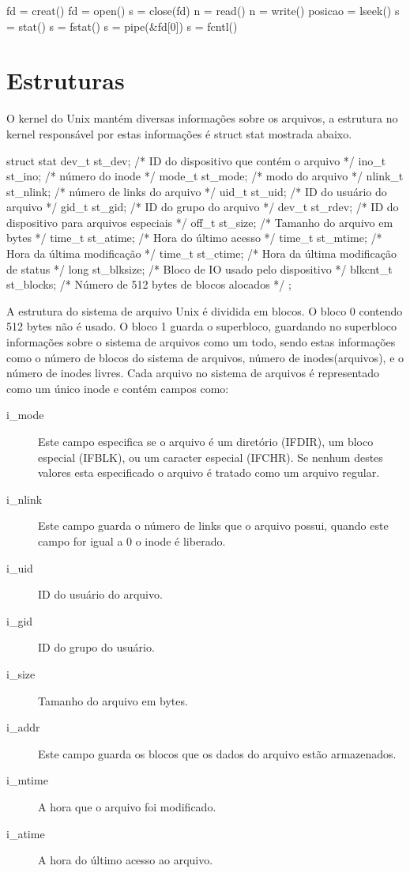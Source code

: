 fd = creat()
fd = open()
s = close(fd)               
n = read()
n = write()
posicao = lseek()
s = stat()
s = fstat() 
s = pipe(\&fd[0])
s = fcntl()

\section{Estruturas}

O kernel do Unix mantém diversas informações sobre os arquivos, a estrutura no kernel responsável por estas informações é struct stat mostrada abaixo.

struct stat {
    dev_t     st_dev;     /* ID do dispositivo que contém o arquivo */
    ino_t     st_ino;     /* número do inode */
    mode_t    st_mode;    /* modo do arquivo */
    nlink_t st_nlink;     /* número de links do arquivo */
    uid_t     st_uid;     /* ID do usuário do arquivo */
    gid_t     st_gid;     /* ID do grupo do arquivo */
    dev_t     st_rdev;    /* ID do dispositivo para arquivos especiais */
    off_t     st_size;    /* Tamanho do arquivo em bytes */
    time_t    st_atime;   /* Hora do último acesso */
    time_t    st_mtime;   /* Hora da última modificação */
    time_t    st_ctime;   /* Hora da última modificação de status */
    long      st_blksize; /* Bloco de IO usado pelo dispositivo */
    blkcnt_t st_blocks;   /* Número de 512 bytes de blocos alocados */
};

A estrutura do sistema de arquivo Unix é dividida em blocos. O bloco 0 contendo 512 bytes não é usado. O bloco 1 guarda o superbloco, guardando no superbloco informações sobre o sistema de arquivos como um todo, sendo estas informações como o número de blocos do sistema de arquivos, número de inodes(arquivos), e o número de inodes livres. Cada arquivo no sistema de arquivos é representado como um único inode e contém campos como:

\begin{description}
\item[i_mode] Este campo especifica se o arquivo é um diretório (IFDIR), um bloco especial (IFBLK), ou um caracter especial (IFCHR). Se nenhum destes valores esta especificado o arquivo é tratado como um arquivo regular.
\item[i_nlink] Este campo guarda o número de links que o arquivo possui, quando este campo for igual a 0 o inode é liberado.
\item[i_uid] ID do usuário do arquivo.
\item[i_gid] ID do grupo do usuário.
\item[i_size] Tamanho do arquivo em bytes.
\item[i_addr] Este campo guarda os blocos que os dados do arquivo estão armazenados.
\item[i_mtime] A hora que o arquivo foi modificado.
\item[i_atime] A hora do último acesso ao arquivo.
\end{description}

